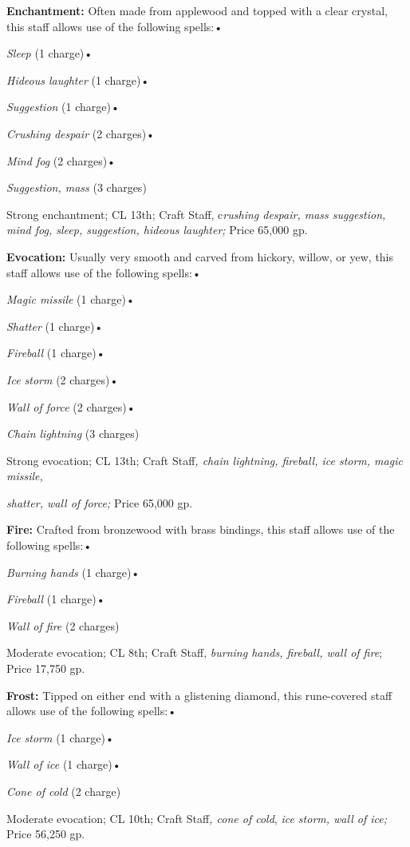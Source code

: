 \documentclass{article}
\begin{document}
\textbf{Enchantment:} Often made from applewood and topped with a clear crystal, 
this staff allows use of the following spells:• 

\textit{Sleep }(1 charge)• 

\textit{Hideous laughter }(1 charge)• 

\textit{Suggestion }(1 charge)• 

\textit{Crushing despair }(2 charges)• 

\textit{Mind fog }(2 charges)• 

\textit{Suggestion, mass }(3 charges)

Strong enchantment; CL 13th; Craft Staff, c\textit{rushing despair, mass suggestion, 
mind fog, sleep, suggestion, hideous laughter; }Price 65,000 gp.

\textbf{Evocation: }Usually very smooth and carved from hickory, willow, or yew, 
this staff allows use of the following spells:• 

\textit{Magic missile }(1 charge)• 

\textit{Shatter }(1 charge)• 

\textit{Fireball }(1 charge)• 

\textit{Ice storm }(2 charges)• 

\textit{Wall of force }(2 charges)• 

\textit{Chain lightning }(3 charges)

Strong evocation; CL 13th; Craft Staff\textit{, chain lightning, fireball, ice 
storm, magic missile,}

\textit{shatter, wall of force; }Price 65,000 gp.

\textbf{Fire:} Crafted from bronzewood with brass bindings, this staff allows use 
of the following spells:• 

\textit{Burning hands }(1 charge)• 

\textit{Fireball }(1 charge)• 

\textit{Wall of fire }(2 charges)

Moderate evocation; CL 8th; Craft Staff, \textit{burning hands, fireball, wall 
of fire}; Price 17,750 gp.

\textbf{Frost:} Tipped on either end with a glistening diamond, this rune-covered 
staff allows use of the following spells:• 

\textit{Ice storm }(1 charge)• 

\textit{Wall of ice }(1 charge)• 

\textit{Cone of cold }(2 charge)

Moderate evocation; CL 10th; Craft Staff\textit{, cone of cold}, \textit{ice storm, 
wall of ice; }Price 56,250 gp.
\end{document}
